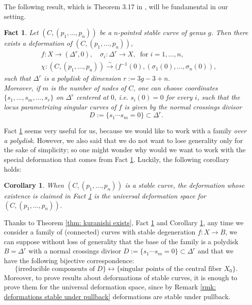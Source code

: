 \documentclass[a4paper,12 pt,titlepage,twoside]{book}
\theoremstyle{plain}
\theoremstyle{theorem}
\newtheorem{fact}[thm]{\textbf{Fact}}
\newtheorem{cor}[thm]{Corollary}
\theoremstyle{definition}
\theoremstyle{remark}
\begin{document}
The following result, which is Theorem 3.17 in \cite{MR2807457}, will be fundamental in our setting. 
\begin{fact}\label{fact: base is a polydisk with good amount of nodes}
	Let $(C, (p_1, \dots, p_n))$ be a $n$-pointed stable curve of genus $g$. Then there exists a deformation of $(C, (p_1,\dots, p_n))$, $$\begin{aligned} &f \colon X \rightarrow (\Delta^r, 0), \quad \sigma_i \colon \Delta^r \rightarrow X, \ \text{ for } i=1,\dots,n,\\  &\chi \colon (C,(p_1,\dots,p_n)) \stackrel{\sim}{\longrightarrow} (f^{-1}(0), (\sigma_1(0), \dots, \sigma_n(0)),\end{aligned}$$ such that $\Delta^r$ is a polydisk of dimension $r:= 3g-3+n.$ \\Moreover, if $m$ is the number of nodes of $C$, one can choose coordinates $\{s_1, \dots, s_m, \dots,s_r\}$ on $\Delta^r$ centered at $0$, i.e. $s_i(0)=0$ for every $i$, such that the locus parametrizing singular curves of $f$ is given by the normal crossings divisor $$D :=  \{s_1 \cdots s_m = 0\}\subset \Delta^r.$$
\end{fact}
Fact \ref{fact: base is a polydisk with good amount of nodes} seems very useful for us, because we would like to work with a family \emph{over a polydisk}. However, we also said that we do not want to lose generality only for the sake of simplicity; so one might wonder why would we want to work with the special deformation that comes from Fact \ref{fact: base is a polydisk with good amount of nodes}. Luckily, the following corollary holds:
\begin{cor}\label{cor: kuranishi has polydisk as base}
	When $(C,(p_1,\dots,p_n))$ is a stable curve, the deformation whose existence is claimed in Fact \ref{fact: base is a polydisk with good amount of nodes} is the universal deformation space for $(C,(p_1,\dots,p_n)).$
\end{cor}
Thanks to Theorem \ref{thm: kuranishi exists}, Fact \ref{fact: base is a polydisk with good amount of nodes} and Corollary \ref{cor: kuranishi has polydisk as base}, any time we consider a family of (connected) curves with stable degeneration $f \colon X \rightarrow B$, we can suppose without loss of generality that the base of the family is a polydisk $B=\Delta^r$ with a normal crossings divisor $D:= \{s_1 \cdots s_m=0\} \subset \Delta^r$ and that we have the following bijective correspondence:
\begin{equation}\label{eq: correspondence irreducible components of divisor and singular points}
\{\text{irreducible components of } D\} \longleftrightarrow \{\text{singular points of the central fiber }X_0\}. %
\end{equation}
Moreover, to prove results about deformations of stable curves, it is enough to prove them for the universal deformation space, since by Remark \ref{rmk: deformations stable under pullback} deformations are stable under pullback.
\end{document}
